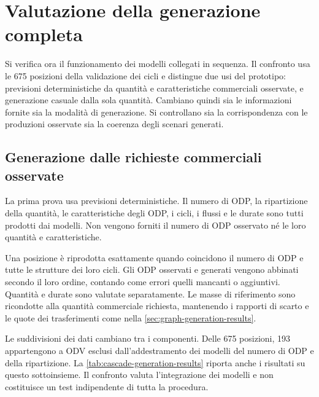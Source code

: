 \section{Valutazione della generazione completa}
\label{sec:complete-generation-evaluation}

Si verifica ora il funzionamento dei modelli collegati in sequenza. Il confronto usa le 675 posizioni della validazione dei cicli e distingue due usi del prototipo: previsioni deterministiche da quantità e caratteristiche commerciali osservate, e generazione casuale dalla sola quantità. Cambiano quindi sia le informazioni fornite sia la modalità di generazione. Si controllano sia la corrispondenza con le produzioni osservate sia la coerenza degli scenari generati.

\subsection{Generazione dalle richieste commerciali osservate}
\label{sec:cascade-observed-inputs}

La prima prova usa previsioni deterministiche. Il numero di ODP, la ripartizione della quantità, le caratteristiche degli ODP, i cicli, i flussi e le durate sono tutti prodotti dai modelli. Non vengono forniti il numero di ODP osservato né le loro quantità e caratteristiche.

Una posizione è riprodotta esattamente quando coincidono il numero di ODP e tutte le strutture dei loro cicli. Gli ODP osservati e generati vengono abbinati secondo il loro ordine, contando come errori quelli mancanti o aggiuntivi. Quantità e durate sono valutate separatamente. Le masse di riferimento sono ricondotte alla quantità commerciale richiesta, mantenendo i rapporti di scarto e le quote dei trasferimenti come nella \cref{sec:graph-generation-results}.

Le suddivisioni dei dati cambiano tra i componenti. Delle 675 posizioni, 193 appartengono a ODV esclusi dall'addestramento dei modelli del numero di ODP e della ripartizione. La \cref{tab:cascade-generation-results} riporta anche i risultati su questo sottoinsieme. Il confronto valuta l'integrazione dei modelli e non costituisce un test indipendente di tutta la procedura.



